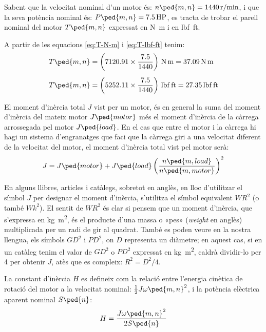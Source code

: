 	
\begin{exemple}[\MotorParellNom{}]
	\addcontentsxms{\MotorParellNom}
    Sabent que la velocitat nominal d'un motor és: $n\ped{m,n} = \qty{1440}{r/min}$, i que la seva potència nominal és: $P\ped{m,n} = \qty{7,5}{HP}$,   es tracta de trobar el parell nominal del motor $T\ped{m,n}$ expressat en \unit{N.m} i en \unit{lbf.ft}.

    A partir de les equacions  \eqref{eq:T-N-m} i \eqref{eq:T-lbf-ft} tenim:
    \begin{align*}
      T\ped{m,n} &= \left(\num{7120,91} \times \frac{\num{7,5}}{1440}\right)
      \,\unit{N.m} = \qty{37,09}{N.m} \\[1ex]
      T\ped{m,n} &= \left(\num{5252,11} \times \frac{\num{7,5}}{1440}\right)
      \,\unit{lbf.ft} = \qty{27,35}{lbf.ft}
    \end{align*}
\end{exemple}


El moment d'inèrcia total $J$ vist per un motor, és en general la suma del moment d'inèrcia del mateix motor  $J\ped{motor}$ més el moment d'inèrcia de la càrrega arrossegada pel motor $J\ped{load}$. En el cas que entre el motor i la càrrega hi hagi un sistema d'engranatges que faci que la càrrega giri a una velocitat diferent de la velocitat del motor, el  moment d'inèrcia total vist pel motor serà:
\begin{equation}\index{moment!d'inèrcia}\index{J@$J$}
    J = J\ped{motor} +  J\ped{load}
    \left(\frac{n\ped{m,load}}{n\ped{m,motor}}\right)^2
\end{equation}

En alguns llibres, articles i catàlegs, sobretot en anglès, en lloc d'utilitzar el símbol $J$ per designar el moment d'inèrcia, s'utilitza el símbol equivalent $WR^2$ (o també $Wk^2$). El sentit de $WR^2$ és clar si pensem que un moment d'inèrcia, que s'expressa en \unit{kg.m^2},  és el producte d'una massa o «pes» (\textit{weight} en anglès) multiplicada per un radi de gir al quadrat. També es poden veure en la nostra llengua, els símbols $GD^2$ i $PD^2$, on $D$ representa un diàmetre; en aquest cas, si en un catàleg tenim el valor de $GD^2$ o $PD^2$ expressat en \unit{kg.m^2}, caldrà dividir-lo per 4 per obtenir $J$, atès que es compleix: $R^2 = D^2/4$.

La constant d'inèrcia $H$ es defineix com la relació entre l'energia cinètica de rotació del motor  a la velocitat nominal: $\frac{1}{2} J \omega\ped{m,n}^2$, i la  potència elèctrica aparent nominal $S\ped{n}$:
\begin{equation}\index{constants!d'inèrcia}\index{H@$H$}
    H = \frac{J \omega\ped{m,n}^2}{2 S\ped{n}}
\end{equation}

